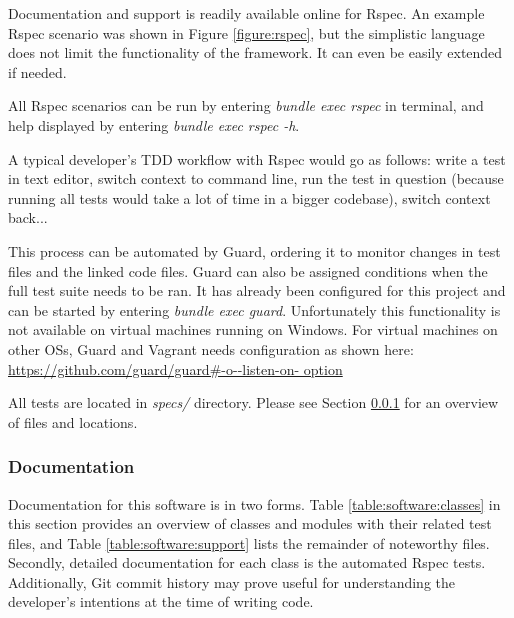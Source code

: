 Documentation and support is readily available online for Rspec. An example
Rspec scenario was shown in Figure \ref{figure:rspec}, but the simplistic
language does not limit the functionality of the framework. It can even be
easily extended if needed.

All Rspec scenarios can be run by entering \textit{bundle exec rspec} in
terminal, and help displayed by entering \textit{bundle exec rspec -h}.

A typical developer's TDD workflow with Rspec would go as follows: write a test
in text editor, switch context to command line, run the test in question
(because running all tests would take a lot of time in a bigger codebase),
switch context back...

This process can be automated by Guard, ordering it to monitor changes in test
files and the linked code files. Guard can also be assigned conditions when the
full test suite needs to be ran. It has already been configured for this
project and can be started by entering \textit{bundle exec guard}.
Unfortunately this functionality is not available on virtual machines running
on Windows. For virtual machines on other OSs, Guard and Vagrant needs
configuration as shown here: \url{https://github.com/guard/guard#-o--listen-on-
option}

All tests are located in \textit{specs/} directory. Please see Section
\ref{sec:maintenance_manual:documentation} for an overview of files and
locations.


\subsubsection{Documentation}
\label{sec:maintenance_manual:documentation}

Documentation for this software is in two forms. Table
\ref{table:software:classes} in this section provides an overview of classes
and modules with their related test files, and Table
\ref{table:software:support} lists the remainder of noteworthy files. Secondly,
detailed documentation for each class is the automated Rspec tests.
Additionally, Git commit history may prove useful for understanding the
developer's intentions at the time of writing code.

